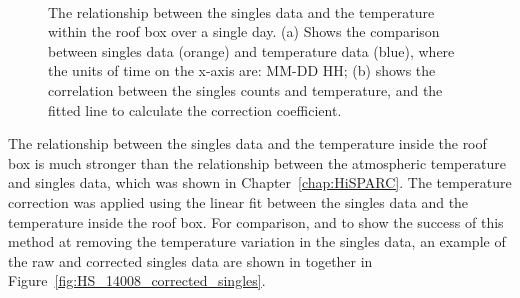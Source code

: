 \begin{figure}[ht!]
	\centering
	 \\
	
	\caption{The relationship between the singles data and the temperature within the roof box over a single day. (a) Shows the comparison between singles data (orange) and temperature data (blue), where the units of time on the x-axis are: MM-DD HH; (b) shows the correlation between the singles counts and temperature, and the fitted line to calculate the correction coefficient.}
	\label{fig:14008_CR_V_T_corr}
\end{figure}

The relationship between the singles data and the temperature inside the roof box is much stronger than the relationship between the atmospheric temperature and singles data, which was shown in Chapter~\ref{chap:HiSPARC}. The temperature correction was applied using the linear fit between the singles data and the temperature inside the roof box. For comparison, and to show the success of this method at removing the temperature variation in the singles data, an example of the raw and corrected singles data are shown in together in Figure~\ref{fig:HS_14008_corrected_singles}. 

